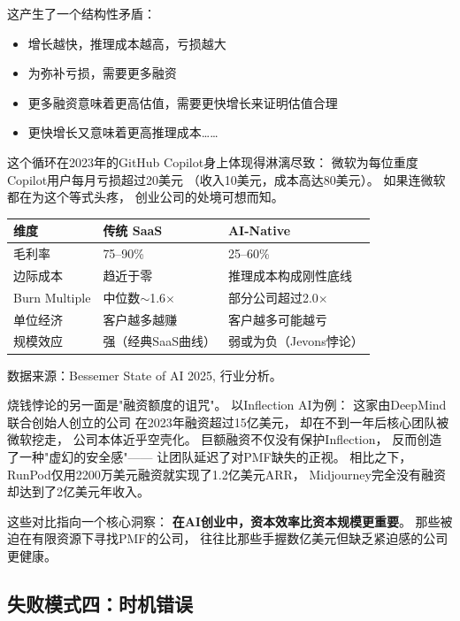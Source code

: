 这产生了一个结构性矛盾：
\begin{itemize}
  \item 增长越快，推理成本越高，亏损越大
  \item 为弥补亏损，需要更多融资
  \item 更多融资意味着更高估值，需要更快增长来证明估值合理
  \item 更快增长又意味着更高推理成本……
\end{itemize}

这个循环在2023年的GitHub Copilot身上体现得淋漓尽致：
微软为每位重度Copilot用户每月亏损超过20美元
（收入10美元，成本高达80美元）。
如果连微软都在为这个等式头疼，
创业公司的处境可想而知。

\begin{keybox}
\small
\begin{tabularx}{\textwidth}{l X X}
\toprule
\rowcolor{figLightGray}
\textbf{维度} & \textbf{传统 SaaS} & \textbf{AI-Native} \\
\midrule
毛利率       & 75--90\%            & 25--60\% \\
边际成本     & 趋近于零             & 推理成本构成刚性底线 \\
Burn Multiple & 中位数$\sim$1.6$\times$ & 部分公司超过2.0$\times$ \\
单位经济      & 客户越多越赚         & 客户越多可能越亏 \\
规模效应      & 强（经典SaaS曲线）   & 弱或为负（Jevons悖论） \\
\bottomrule
\end{tabularx}

\medskip
\noindent 数据来源：Bessemer State of AI 2025, 行业分析。
\end{keybox}

烧钱悖论的另一面是"融资额度的诅咒"。
以Inflection AI为例：
这家由DeepMind联合创始人创立的公司
在2023年融资超过15亿美元，
却在不到一年后核心团队被微软挖走，
公司本体近乎空壳化。
巨额融资不仅没有保护Inflection，
反而创造了一种"虚幻的安全感"——
让团队延迟了对PMF缺失的正视。
相比之下，RunPod仅用2200万美元融资就实现了1.2亿美元ARR，
Midjourney完全没有融资却达到了2亿美元年收入。

这些对比指向一个核心洞察：
\textbf{在AI创业中，资本效率比资本规模更重要}。
那些被迫在有限资源下寻找PMF的公司，
往往比那些手握数亿美元但缺乏紧迫感的公司更健康。


\subsection{失败模式四：时机错误}

